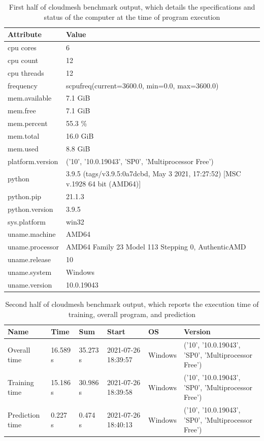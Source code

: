 \documentclass[acmtog,authorversion]{acmart}
\begin{document}
\begin{table}[htb]
\caption{First half of cloudmesh benchmark output, which details the specifications and status of the computer at the time of program execution}
\label{tab:resource}
\begin{tabular}{p{2cm}p{5cm}}
Attribute        & Value  \\
\hline
 cpu cores        & 6    \\
 cpu count        & 12   \\
 cpu threads      & 12    \\
 frequency        & scpufreq(current=3600.0, min=0.0, max=3600.0)       \\
 mem.available    & 7.1 GiB \\
 mem.free         & 7.1 GiB \\
 mem.percent      & 55.3 \%  \\
 mem.total        & 16.0 GiB \\
 mem.used         & 8.8 GiB  \\
 platform.version & ('10', '10.0.19043', 'SP0', 'Multiprocessor Free') \\
 python           & 3.9.5 (tags/v3.9.5:0a7dcbd, May  3 2021, 17:27:52) [MSC v.1928 64 bit (AMD64)]  \\
 python.pip       & 21.1.3   \\
 python.version   & 3.9.5 \\
 sys.platform     & win32  \\
 uname.machine    & AMD64          \\
 uname.processor  & AMD64 Family 23 Model 113 Stepping 0, AuthenticAMD   \\
 uname.release    & 10        \\
 uname.system     & Windows \\
 uname.version    & 10.0.19043 \\
 \hline
 \end{tabular}
 \end{table}



\begin{table}[htb]
\caption{Second half of cloudmesh benchmark output, which reports the execution time of training, overall program, and prediction}
\label{tab:second}
\begin{tabular}{llllll}
Name            &   Time   &    Sum   & Start               & OS      & Version \\
\hline
 Overall time    & 16.589 s & 35.273 s & 2021-07-26 18:39:57 & Windows & ('10', '10.0.19043', 'SP0', 'Multiprocessor Free') \\
Training time   & 15.186 s & 30.986 s & 2021-07-26 18:39:58 & Windows & ('10', '10.0.19043', 'SP0', 'Multiprocessor Free') \\
 Prediction time &  0.227 s &  0.474 s & 2021-07-26 18:40:13 & Windows & ('10', '10.0.19043', 'SP0', 'Multiprocessor Free') \\
 \hline
 \end{tabular}
 \end{table}
 
\end{document}
